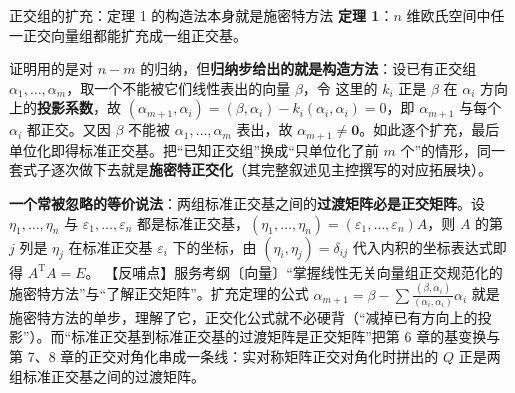 \begin{fdeep}{正交组的扩充：定理 1 的构造法本身就是施密特方法}
\textbf{定理 1}：$n$ 维欧氏空间中任一正交向量组都能扩充成一组正交基。

证明用的是对 $n-m$ 的归纳，但\textbf{归纳步给出的就是构造方法}：设已有正交组 $\alpha_1,\dots,\alpha_m$，取一个不能被它们线性表出的向量 $\beta$，令
这里的 $k_i$ 正是 $\beta$ 在 $\alpha_i$ 方向上的\textbf{投影系数}，故 $(\alpha_{m+1},\alpha_i)=(\beta,\alpha_i)-k_i(\alpha_i,\alpha_i)=0$，即 $\alpha_{m+1}$ 与每个 $\alpha_i$ 都正交。又因 $\beta$ 不能被 $\alpha_1,\dots,\alpha_m$ 表出，故 $\alpha_{m+1}\ne\mathbf{0}$。如此逐个扩充，最后单位化即得标准正交基。把“已知正交组”换成“只单位化了前 $m$ 个”的情形，同一套式子逐次做下去就是\textbf{施密特正交化}（其完整叙述见主控撰写的对应拓展块）。

\textbf{一个常被忽略的等价说法}：两组标准正交基之间的\textbf{过渡矩阵必是正交矩阵}。设 $\eta_1,\dots,\eta_n$ 与 $\varepsilon_1,\dots,\varepsilon_n$ 都是标准正交基，$(\eta_1,\dots,\eta_n)=(\varepsilon_1,\dots,\varepsilon_n)A$，则 $A$ 的第 $j$ 列是 $\eta_j$ 在标准正交基 $\varepsilon_i$ 下的坐标，由 $(\eta_i,\eta_j)=\delta_{ij}$ 代入内积的坐标表达式即得 $A^{\mathrm T}A=E$。
【反哺点】服务考纲〔向量〕“掌握线性无关向量组正交规范化的施密特方法”与“了解正交矩阵”。扩充定理的公式 $\alpha_{m+1}=\beta-\sum\frac{(\beta,\alpha_i)}{(\alpha_i,\alpha_i)}\alpha_i$ 就是施密特方法的单步，理解了它，正交化公式就不必硬背（“减掉已有方向上的投影”）。而“标准正交基到标准正交基的过渡矩阵是正交矩阵”把第 6 章的基变换与第 7、8 章的正交对角化串成一条线：实对称矩阵正交对角化时拼出的 $Q$ 正是两组标准正交基之间的过渡矩阵。
\end{fdeep}



